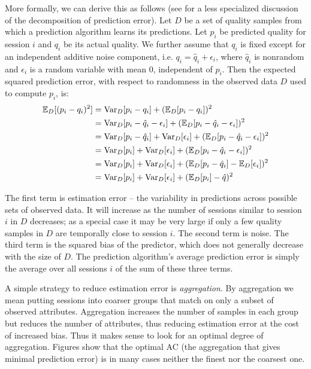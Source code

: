 More formally, we can derive this as follows (see \cite{domingos2000unified} for a less specialized discussion of the decomposition of prediction error).  Let $D$ be a set of quality samples from which a prediction algorithm learns its predictions.  Let $p_i$ be predicted quality for session $i$ and $q_i$ be its actual quality.  We further assume that $q_i$ is fixed except for an independent additive noise component, i.e. $q_i = \hat{q}_i + \epsilon_i$, where $\hat{q}_i$ is nonrandom and $\epsilon_i$ is a random variable with mean $0$, independent of $p_i$.  Then the expected squared prediction error, with respect to randomness in the observed data $D$ used to compute $p_i$, is:
\begin{align*}
  \operatorname{\mathbb{E}}_D[(p_i - q_i)^2] &= \operatorname{\text{Var}}_D[p_i - q_i] + (\operatorname{\mathbb{E}}_D[p_i - q_i])^2 \\
  &= \operatorname{\text{Var}}_D[p_i - \hat{q}_i - \epsilon_i] + (\operatorname{\mathbb{E}}_D[p_i - \hat{q}_i - \epsilon_i])^2 \\
  &= \operatorname{\text{Var}}_D[p_i - \hat{q}_i] + \operatorname{\text{Var}}_D[\epsilon_i] + (\operatorname{\mathbb{E}}_D[p_i - \hat{q}_i - \epsilon_i])^2\\
  &= \operatorname{\text{Var}}_D[p_i] + \operatorname{\text{Var}}_D[\epsilon_i] + (\operatorname{\mathbb{E}}_D[p_i - \hat{q}_i - \epsilon_i])^2\\
  &= \operatorname{\text{Var}}_D[p_i] + \operatorname{\text{Var}}_D[\epsilon_i] + (\operatorname{\mathbb{E}}_D[p_i - \hat{q}_i] - \operatorname{\mathbb{E}}_D[\epsilon_i])^2\\
  &= \operatorname{\text{Var}}_D[p_i] + \operatorname{\text{Var}}_D[\epsilon_i] + (\operatorname{\mathbb{E}}_D[p_i] - \hat{q})^2
\end{align*}

The first term is estimation error -- the variability in predictions across possible sets of observed data.  It will increase as the number of sessions similar to session $i$ in $D$ decreases; as a special case it may be very large if only a few quality samples in $D$ are temporally close to session $i$.  The second term is noise.  The third term is the squared bias of the predictor, which does not generally decrease with the size of $D$.  The prediction algorithm's average prediction error is simply the average over all sessions $i$ of the sum of these three terms.

A simple strategy to reduce estimation error is {\it aggregation}.  By aggregation we mean putting sessions into coarser groups that match on only a subset of observed attributes.  Aggregation increases the number of samples in each group but reduces the number of attributes, thus reducing estimation error at the cost of increased bias.  Thus it makes sense to look for an optimal degree of aggregation.  Figures \fillme show that the optimal AC (the aggregation that gives minimal prediction error) is in many cases neither the finest nor the coarsest one.



